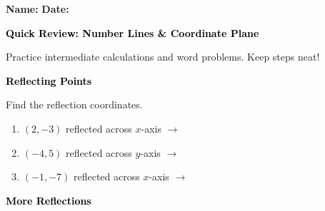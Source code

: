 \documentclass[12pt, letterpaper, fleqn]{article}
\newcommand{\blank}{\underline{\hspace{2.2cm}}}
\begin{document}
\textbf{Name:} \underline{\hspace{5cm}}
\hfill
\textbf{Date:} \underline{\hspace{3cm}}\\

\begin{tcolorbox}[colback=black!10]
    \large\textcolor{black}{\textbf{Quick Review: Number Lines \& Coordinate Plane}}
\end{tcolorbox}

\vspace{3mm}
\noindent
Practice intermediate calculations and word problems. Keep steps neat!

\vspace{4mm}

\begin{tcolorbox}[colback=black!10]
\large\textcolor{black}{\textbf{Reflecting Points}}
\end{tcolorbox}

\noindent
Find the reflection coordinates.

\vspace{3mm}
\begin{enumerate}[itemsep=2.2cm, leftmargin=0.6cm]
\item $(2, -3)$ reflected across $x$-axis $\rightarrow$ \blank

\vspace{2cm}

\item $(-4, 5)$ reflected across $y$-axis $\rightarrow$ \blank

\vspace{2cm}

\item $(-1, -7)$ reflected across $x$-axis $\rightarrow$ \blank

\vspace{2cm}

\end{enumerate}

\newpage

\begin{tcolorbox}[colback=black!10]
\large\textcolor{black}{\textbf{More Reflections}}
\end{tcolorbox}
\end{document}
